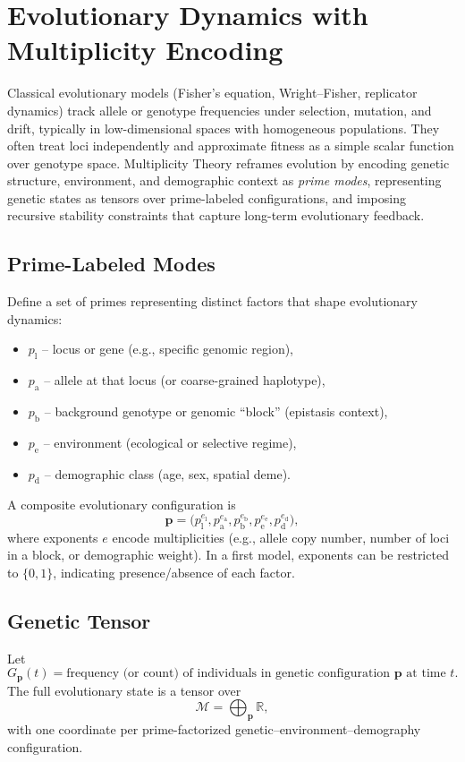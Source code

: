 \documentclass[11pt]{article}
\begin{document}
\section{Evolutionary Dynamics with Multiplicity Encoding}
Classical evolutionary models (Fisher's equation, Wright--Fisher, replicator dynamics) track allele or genotype frequencies under selection, mutation, and drift, typically in low-dimensional spaces with homogeneous populations. They often treat loci independently and approximate fitness as a simple scalar function over genotype space. Multiplicity Theory reframes evolution by encoding genetic structure, environment, and demographic context as \emph{prime modes}, representing genetic states as tensors over prime-labeled configurations, and imposing recursive stability constraints that capture long-term evolutionary feedback.

\subsection{Prime-Labeled Modes}
Define a set of primes representing distinct factors that shape evolutionary dynamics:
\begin{itemize}
    \item $p_{\text{l}}$ -- locus or gene (e.g., specific genomic region),
    \item $p_{\text{a}}$ -- allele at that locus (or coarse-grained haplotype),
    \item $p_{\text{b}}$ -- background genotype or genomic ``block'' (epistasis context),
    \item $p_{\text{e}}$ -- environment (ecological or selective regime),
    \item $p_{\text{d}}$ -- demographic class (age, sex, spatial deme).
\end{itemize}
A composite evolutionary configuration is
\[
\mathbf{p}
=
\big(
p_{\text{l}}^{e_{\text{l}}},
p_{\text{a}}^{e_{\text{a}}},
p_{\text{b}}^{e_{\text{b}}},
p_{\text{e}}^{e_{\text{e}}},
p_{\text{d}}^{e_{\text{d}}}
\big),
\]
where exponents $e$ encode multiplicities (e.g., allele copy number, number of loci in a block, or demographic weight). In a first model, exponents can be restricted to $\{0,1\}$, indicating presence/absence of each factor.

\subsection{Genetic Tensor}
Let
\[
G_{\mathbf{p}}(t)
=
\text{frequency (or count) of individuals in genetic configuration }
\mathbf{p}
\text{ at time } t.
\]
The full evolutionary state is a tensor over
\[
\mathcal{M} = \bigoplus_{\mathbf{p}} \mathbb{R},
\]
with one coordinate per prime-factorized genetic--environment--demography configuration.
\end{document}
